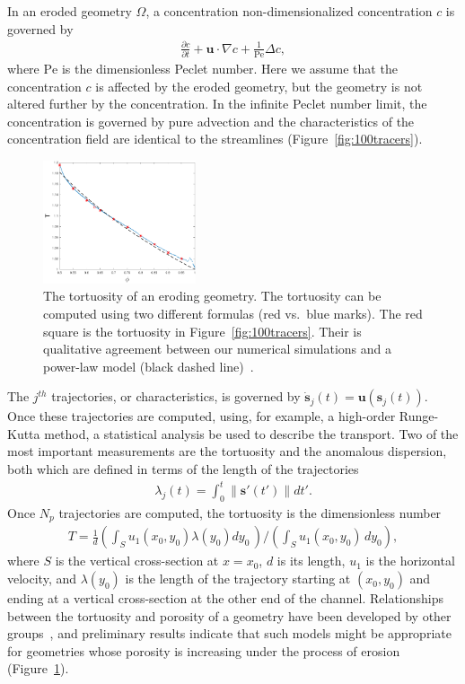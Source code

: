 \documentclass[12pt]{article}
\newcommand{\pd}[2]{ \frac{ \partial #1}{ \partial #2 } }
\newcommand{\bvec}[1]{{\mathbf{#1}}}
\newcommand{\Pe}{\mathrm{Pe}}
\newcommand{\uu}{\bvec{u}}
\renewcommand{\ss}{{\mathbf{s}}}
\begin{document}
In an eroded geometry $\Omega$, a concentration non-dimensionalized
concentration $c$ is governed by
\begin{align}
  \pd{c}{t} + \uu \cdot \nabla c + \frac{1}{\Pe} \Delta c, 
\end{align}
where $\Pe$ is the dimensionless Peclet number. Here we assume that the
concentration $c$ is affected by the eroded geometry, but the geometry
is not altered further by the concentration. In the infinite Peclet
number limit, the concentration is governed by pure advection and the
characteristics of the concentration field are identical to the
streamlines (Figure~\ref{fig:100tracers}).
\begin{figure}
  \includegraphics[width=0.4\textwidth]{figs/tort_eulerian100}
  \caption{\label{fig:100tortuosity} The tortuosity of an eroding
  geometry. The tortuosity can be computed using two different formulas
  (red vs.~blue marks). The red square is the tortuosity in
  Figure~\ref{fig:100tracers}. Their is qualitative agreement between
  our numerical simulations and a power-law model (black dashed
  line)~\cite{mat-kha-koz2008}.}
\end{figure}

The $j^{th}$ trajectories, or characteristics, is governed by
$\dot{\ss}_j(t) = \uu(\ss_j(t))$. Once these trajectories are computed,
using, for example, a high-order Runge-Kutta method, a statistical
analysis be used to describe the transport. Two of the most important
measurements are the tortuosity and the anomalous dispersion, both which
are defined in terms of the length of the trajectories
\begin{align}
  \lambda_j(t) = \int_{0}^{t} \|\ss'(t')\| dt'.
\end{align}
Once $N_p$ trajectories are computed, the tortuosity is the
dimensionless number
\begin{align}
  T = \frac{1}{d} \left(\int_{S} u_1(x_0,y_0)\lambda(y_0) dy_0\, \right)
  \Bigg/ \left(\int_S u_1(x_0,y_0)\, dy_0 \right),
\end{align}
where $S$ is the vertical cross-section at $x=x_0$, $d$ is its length,
$u_1$ is the horizontal velocity, and $\lambda(y_0)$ is the length of
the trajectory starting at $(x_0,y_0)$ and ending at a vertical
cross-section at the other end of the channel. Relationships between the
tortuosity and porosity of a geometry have been developed by other
groups~\cite{kop-kat-tim1996, dud-koz-mat2011, mat-kha-koz2008}, and
preliminary results indicate that such models might be appropriate for
geometries whose porosity is increasing under the process of erosion
(Figure~\ref{fig:100tortuosity}).
\end{document}
